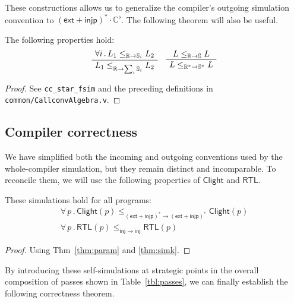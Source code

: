 \documentclass[sigplan,10pt,review,anonymous]{acmart}
\newcommand{\kw}[1]{\ensuremath{ \mathsf{#1} }}
\begin{document}
These constructions allows us to generalize the compiler's
outgoing simulation convention to
$(\kw{ext} + \kw{injp})^* \cdot \mathbb{C}^\flat$.
The following theorem will also be useful.

\begin{theorem} \label{thm:simk} %
The following properties hold:
\[
  \AxiomC{$\forall i \,.\,
    L_1 \le_{\mathbb{R} \rightarrow \mathbb{S}_i} L_2$}
  \UnaryInfC{$
    L_1 \le_{\mathbb{R} \rightarrow \sum_i \mathbb{S}_i} L_2$}
  \DisplayProof
  \quad
  \AxiomC{$L \le_{\mathbb{R} \rightarrow \mathbb{S}} L$}
  \UnaryInfC{$L \le_{\mathbb{R}^* \rightarrow \mathbb{S}^*} L$}
  \DisplayProof
\]
\begin{proof}
See \texttt{cc\_star\_fsim} and the preceding definitions
in \texttt{common/CallconvAlgebra.v}.
\end{proof}
\end{theorem}


\subsection{Compiler correctness} %

We have simplified both the incoming and outgoing conventions
used by the whole-compiler simulation,
but they remain distinct and incomparable.
To reconcile them,
we will use the following properties
of \kw{Clight} and \kw{RTL}.

\begin{theorem} \label{thm:lprops} %
These simulations hold
for all programs:
\begin{gather*}
\forall \, p \,.\,
  \kw{Clight}(p)
  \le_{(\kw{ext} + \kw{injp})^* \rightarrow (\kw{ext} + \kw{injp})^*}
  \kw{Clight}(p) \\
\forall \, p \,.\,
  \kw{RTL}(p)
  \le_{\kw{inj} \rightarrow \kw{inj}}
  \kw{RTL}(p)
\end{gather*}
\begin{proof}
Using Thm~\ref{thm:param} and \ref{thm:simk}.
\end{proof}
\end{theorem}

By introducing these self-simulations
at strategic points in the overall composition of passes
shown in Table~\ref{tbl:passes},
we can finally establish the following correctness theorem.
\end{document}

